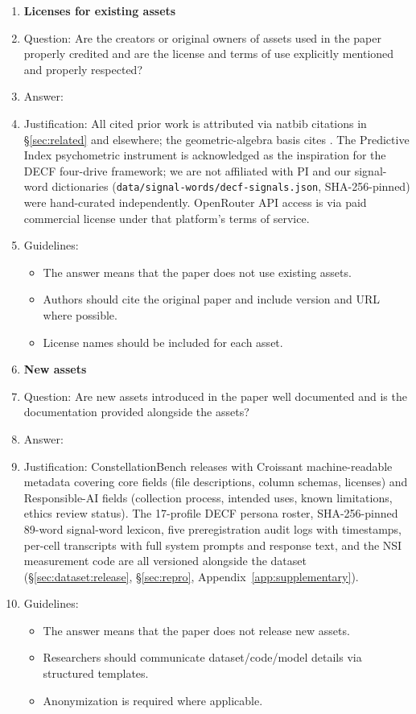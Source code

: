 \begin{enumerate}
\item {\bf Licenses for existing assets}
    \item[] Question: Are the creators or original owners of assets used in the paper properly credited and are the license and terms of use explicitly mentioned and properly respected?
    \item[] Answer: \answerYes{}
    \item[] Justification: All cited prior work is attributed via natbib citations in \S\ref{sec:related} and elsewhere; the geometric-algebra basis cites \citet{brehmer2023geometric}. The Predictive Index psychometric instrument is acknowledged as the inspiration for the DECF four-drive framework; we are not affiliated with PI and our signal-word dictionaries (\texttt{data/signal-words/decf-signals.json}, SHA-256-pinned) were hand-curated independently. OpenRouter API access is via paid commercial license under that platform's terms of service.
    \item[] Guidelines:
    \begin{itemize}
        \item The answer \answerNA{} means that the paper does not use existing assets.
        \item Authors should cite the original paper and include version and URL where possible.
        \item License names should be included for each asset.
    \end{itemize}

\item {\bf New assets}
    \item[] Question: Are new assets introduced in the paper well documented and is the documentation provided alongside the assets?
    \item[] Answer: \answerYes{}
    \item[] Justification: ConstellationBench releases with Croissant machine-readable metadata covering core fields (file descriptions, column schemas, licenses) and Responsible-AI fields (collection process, intended uses, known limitations, ethics review status). The 17-profile DECF persona roster, SHA-256-pinned 89-word signal-word lexicon, five preregistration audit logs with timestamps, per-cell transcripts with full system prompts and response text, and the NSI measurement code are all versioned alongside the dataset (\S\ref{sec:dataset:release}, \S\ref{sec:repro}, Appendix~\ref{app:supplementary}).
    \item[] Guidelines:
    \begin{itemize}
        \item The answer \answerNA{} means that the paper does not release new assets.
        \item Researchers should communicate dataset/code/model details via structured templates.
        \item Anonymization is required where applicable.
    \end{itemize}


\end{enumerate}
